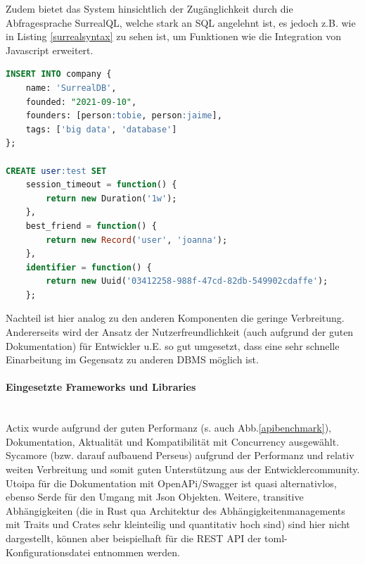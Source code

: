 \documentclass[notitlepage, hidelinks]{article}
\begin{document}
Zudem bietet das System hinsichtlich der Zugänglichkeit durch die Abfragesprache SurrealQL, welche stark an SQL angelehnt ist, es jedoch z.B. wie in Listing \ref{surrealsyntax} zu sehen ist, um Funktionen wie die Integration von Javascript erweitert.

\begin{lstlisting}[language=SQL,frame=single,caption=SQL ähnliche Syntax in Surreal DB,label=surrealsyntax]
INSERT INTO company {
	name: 'SurrealDB',
	founded: "2021-09-10",
	founders: [person:tobie, person:jaime],
	tags: ['big data', 'database']
};

CREATE user:test SET
	session_timeout = function() {
		return new Duration('1w');
	},
	best_friend = function() {
		return new Record('user', 'joanna');
	},
	identifier = function() {
		return new Uuid('03412258-988f-47cd-82db-549902cdaffe');
	};
\end{lstlisting}

Nachteil ist hier analog zu den anderen Komponenten die geringe Verbreitung. Andererseits wird der Ansatz der Nutzerfreundlichkeit (auch aufgrund der guten Dokumentation) für Entwickler u.E. so gut umgesetzt, dass eine sehr schnelle Einarbeitung im Gegensatz zu anderen DBMS möglich ist.

\paragraph{Eingesetzte Frameworks und Libraries} \mbox{} \\
Actix wurde aufgrund der guten Performanz (s. auch Abb.\ref{apibenchmark}), Dokumentation, Aktualität und Kompatibilität mit Concurrency ausgewählt. Sycamore (bzw. darauf aufbauend Perseus) aufgrund der Performanz und relativ weiten Verbreitung und somit guten Unterstützung aus der Entwicklercommunity. Utoipa für die Dokumentation mit OpenAPi/Swagger ist quasi alternativlos, ebenso Serde für den Umgang mit Json Objekten. Weitere, transitive Abhängigkeiten (die in Rust qua Architektur des Abhängigkeitenmanagements mit Traits und Crates sehr kleinteilig und quantitativ hoch sind) sind hier nicht dargestellt, können aber beispielhaft für die REST API der toml- Konfigurationsdatei entnommen werden.
\end{document}
